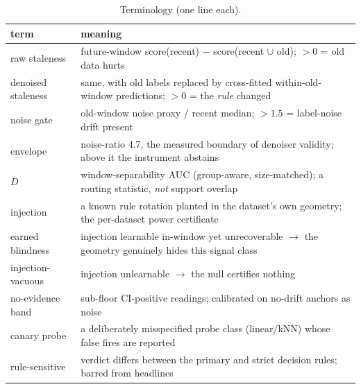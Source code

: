 \documentclass[10pt]{article} %
\begin{document}
\begin{table}[t]
\caption{Terminology (one line each).}
\label{tab:terms}
\centering
\footnotesize
\begin{tabular}{@{}l>{\raggedright\arraybackslash}p{4.55in}@{}}
\toprule
term & meaning \\
\midrule
raw staleness & future-window score(recent) $-$ score(recent $\cup$ old); $>0$ = old data hurts \\
denoised staleness & same, with old labels replaced by cross-fitted within-old-window predictions; $>0$ = the \emph{rule} changed \\
noise gate & old-window noise proxy / recent median; $>1.5$ = label-noise drift present \\
envelope & noise-ratio 4.7, the measured boundary of denoiser validity; above it the instrument abstains \\
$D$ & window-separability AUC (group-aware, size-matched); a routing statistic, \emph{not} support overlap \\
injection & a known rule rotation planted in the dataset's own geometry; the per-dataset power certificate \\
earned blindness & injection learnable in-window yet unrecoverable $\to$ the geometry genuinely hides this signal class \\
injection-vacuous & injection unlearnable $\to$ the null certifies nothing \\
no-evidence band & sub-floor CI-positive readings; calibrated on no-drift anchors as noise \\
canary probe & a deliberately misspecified probe class (linear/kNN) whose false fires are reported \\
rule-sensitive & verdict differs between the primary and strict decision rules; barred from headlines \\
\bottomrule
\end{tabular}
\end{table}
\end{document}

